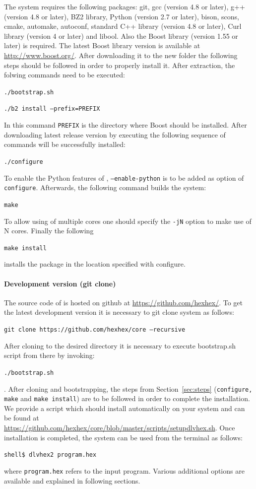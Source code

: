 \documentclass[14pt,a4paper, titlepage]{article}
\begin{document}
The system requires the following packages: git, gcc (version 4.8 or later), g++ (version 4.8 or later), BZ2 library, Python (version 2.7 or later), bison, scons, cmake, automake, autoconf, standard C++ library (version 4.8 or later), Curl library (version 4 or later) and libool. Also the Boost library (version 1.55 or later) is required. The latest Boost library version is available at \url{http://www.boost.org/}. After downloading it to the new folder the following steps should be followed in order to properly install it. After extraction, the folwing commands need to be executed:
\\ \centerline{\texttt{./bootstrap.sh}}
\centerline{\texttt{./b2 install --prefix=PREFIX}} In this command \texttt{PREFIX} is the directory where Boost should be installed. After downloading latest release version by executing the following sequence of commands \dlvhex{} will be successfully installed:
\\ \centerline{\texttt{./configure}} To enable the Python features of \dlvhex{}, \texttt{--enable-python} is to be added as option of \texttt{configure}. Afterwards, the following command builds the system:
\\ \centerline{\texttt{make}} To allow using of multiple cores one should specify the \texttt{-jN} option to make use of N cores. Finally the following
\\ \centerline{\texttt{make install}} installs the package in the location specified with configure.  
   
\paragraph{Development version (git clone)}
The source code of \dlvhex{} is hosted on github at \url{https://github.com/hexhex/}. To get the latest development version it is necessary to git clone system as follows:
\\ \centerline{\texttt{git clone https://github.com/hexhex/core --recursive}} 
After cloning to the desired directory it is necessary to execute bootstrap.sh script from there by invoking: \\ \centerline{\texttt{./bootstrap.sh}}. 
After cloning and bootstrapping, the steps from Section~\ref{sec:steps} (\texttt{configure, make} and \texttt{make install}) are to be followed in order to complete the installation.
We provide a script which should install \dlvhex{} automatically on your system and can be found at \url{https://github.com/hexhex/core/blob/master/scripts/setupdlvhex.sh}.
Once installation is completed, the system can be used from the terminal as follows:\\ 
\centerline{\texttt{shell\$ dlvhex2 program.hex}} where \texttt{program.hex} refers to the input program. Various additional options are available and explained in following sections.    
\end{document}
